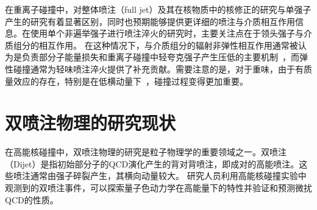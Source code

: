 在重离子碰撞中，对整体喷注（full jet）及其在核物质中的核修正的研究与单强子产生的研究有着显著区别，同时也预期能够提供更详细的喷注与介质相互作用信息。在使用单个非遍举强子进行喷注淬火的研究时，主要关注点在于领头强子与介质组分的相互作用。
在这种情况下，与介质组分的辐射非弹性相互作用通常被认为是负责部分子能量损失和重离子碰撞中轻夸克强子产生压低的主要机制~\parencite{Qin:2007rn}，而弹性碰撞通常为轻味喷注淬火提供了补充贡献。需要注意的是，对于重味，由于有质量效应的存在，特别是在低横动量下~\parencite{Cao:2013ita}，碰撞过程变得更加重要。








\section{双喷注物理的研究现状}

	在高能核碰撞中，双喷注物理的研究是粒子物理学的重要领域之一。双喷注（Dijet）是指初始部分子的QCD演化产生的背对背喷注，即成对的高能喷注。这些喷注通常由强子碎裂产生，其横向动量较大。
	研究人员利用高能核碰撞实验中观测到的双喷注事件，可以探索量子色动力学在高能量下的特性并验证和预测微扰QCD的性质。

